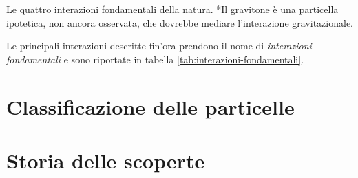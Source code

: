         \begin{table}
            \centering
            
            \caption{Le quattro interazioni fondamentali della natura. *Il gravitone è una particella ipotetica, non ancora osservata, che dovrebbe mediare l'interazione gravitazionale.}
            \label{tab:interazioni-fondamentali}
        \end{table}
        Le principali interazioni descritte fin'ora prendono il nome di \emph{interazioni fondamentali} e sono riportate in tabella \ref{tab:interazioni-fondamentali}.

    \section{Classificazione delle particelle}
        \begin{figure}
            \centering
            
        \end{figure}
    \section{Storia delle scoperte}